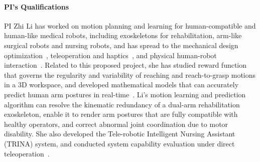 \documentclass[letterpaper, 11 pt, onecolumn]{article}
\begin{document}





\noindent




\paragraph*{PI's Qualifications}
PI Zhi Li has worked on motion planning and learning for human-compatible and human-like medical robots, including exoskeletons for rehabilitation, arm-like surgical robots and nursing robots, and has spread to the mechanical design optimization~\cite{li2016design}, teleoperation and haptics~\cite{li2009networked,li2009remote}, and physical human-robot interaction~\cite{li2017study}. Related to this proposed project, she has studied reward function that governs the regularity and variability of reaching and reach-to-grasp motions in a 3D workspace, and developed mathematical models that can accurately predict human arm postures in real-time~\cite{kim2012resolving,Rosen_Li_EMBC:13,Rosen_Li_IROSChapt:13,Rosen_Li_IROS:14,Rosen_Li_J:14, li2017reaching}. Li's motion learning and prediction algorithm can resolve the kinematic redundancy of a dual-arm rehabilitation exoskeleton, enable it to render arm postures that are fully compatible with healthy operators, and correct abnormal joint coordination due to motor disability. She also developed the Tele-robotic Intelligent Nursing Assistant (TRINA) system, and conducted system capability evaluation under direct teleoperation~\cite{Hauser_Li_TRINA:17}.
\end{document}
